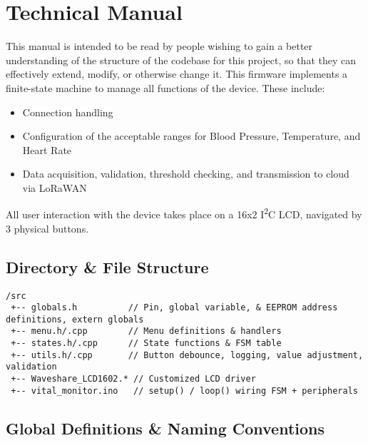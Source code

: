 \newpage
\section*{Technical Manual}
This manual is intended to be read by people wishing to gain a better understanding of the structure of the codebase for this project, so that they can effectively extend, modify, or otherwise change it.
This firmware implements a finite-state machine to manage all functions of the device. These include:
\begin{itemize}
	\item Connection handling
	\item Configuration of the acceptable ranges for Blood Pressure, Temperature, and Heart Rate
	\item Data acquisition, validation, threshold checking, and transmission to cloud via LoRaWAN
\end{itemize}
All user interaction with the device takes place on a 16x2 I\textsuperscript{2}C LCD, navigated by 3 physical buttons.

\subsection{Directory \& File Structure}
\begin{lstlisting}
/src
 +-- globals.h          // Pin, global variable, & EEPROM address definitions, extern globals  
 +-- menu.h/.cpp        // Menu definitions & handlers  
 +-- states.h/.cpp      // State functions & FSM table  
 +-- utils.h/.cpp       // Button debounce, logging, value adjustment, validation  
 +-- Waveshare_LCD1602.* // Customized LCD driver  
 +-- vital_monitor.ino   // setup() / loop() wiring FSM + peripherals  
\end{lstlisting}

\subsection{Global Definitions \& Naming Conventions}
